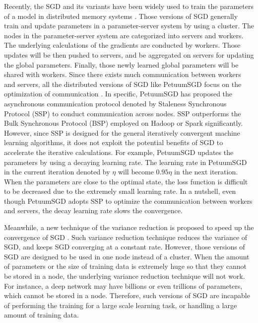 \documentclass[preprint,review,11pt,a4paper]{elsarticle}
\begin{document}
Recently, the SGD and its variants have been widely used to train the parameters of a model in distributed memory systems \cite{Dean:2012wx, Li:2014tt, Xing:2015ib}. Those versions of SGD generally train and update parameters in a parameter-server system by using a cluster. The nodes in the parameter-server system are categorized into servers and workers. The underlying calculations of the gradients are conducted by workers. Those updates will be then pushed to servers, and be aggregated on servers for updating the global parameters. Finally, those newly learned global parameters will be shared with workers. Since there exists much communication between workers and servers, all the distributed versions of SGD like PetuumSGD focus on the optimization of communication \cite{Xing:2015ib}.  In specific, PetuumSGD has proposed the asynchronous communication protocol denoted by Staleness Synchronous Protocol (SSP) to conduct communication across nodes. SSP outperforms the Bulk Synchronous Protocol (BSP) employed on Hadoop or Spark significantly. However, since SSP is designed for the general iteratively convergent machine learning algorithms, it does not exploit the potential benefits of SGD to accelerate the iterative calculations. For example, PetuumSGD updates the parameters by using a decaying learning rate. The learning rate in PetuumSGD in the current iteration denoted by $\eta$ will become $0.95\eta$ in the next iteration. When the parameters are close to the optimal state, the loss function is difficult to be decreased due to the extremely small learning rate. In a nutshell,   even though PetuumSGD adopts SSP  to optimize the communication between workers and servers, the decay learning rate slows the convergence.

Meanwhile, a new technique of the variance reduction is proposed to speed up the convergence of SGD \cite{Johnson:9MAvkbgy, Zhao:SZfxEHHg, Reddi:2015vj}. Such variance reduction technique reduces the variance of SGD, and keeps SGD converging at a constant rate.   However, those versions of SGD are designed to be used in one node instead of a cluster. When the amount of parameters or the size of training data is extremely huge so that they cannot be stored in a node, the underlying variance reduction technique will not work. For instance, a deep network may have billions or even trillions of parameters, which cannot be stored in a node. Therefore, such versions of SGD are incapable of performing the training for a large scale learning task, or handling a large amount of training data.
\end{document}
